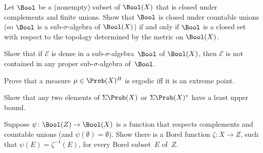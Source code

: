\begin{exercises}

\item \label{sigma<>closed}
Let $\Bool$ be a (nonempty) subset of $\Bool(X)$ that is closed under complements and finite unions. Show that $\Bool$ is closed under countable unions (so $\Bool$ is a sub-$\sigma$-algebra of $\Bool(X)$) if and only if $\Bool$ is a closed set with respect to the topology determined by the metric on $\Bool(X)$.

\item \label{DenseGensSigmaAlg}
Show that if $\mathcal{E}$ is dense in a sub-$\sigma$-algebra~$\Bool$ of $\Bool(X)$, then $\mathcal{E}$ is not contained in any proper sub-$\sigma$-algebra of~$\Bool$.

\item \label{Erg<>Extreme}
Prove that a measure $\mu \in \Prob(X)^H$ is ergodic iff it is an extreme point.

\item \label{ProbLUB}
Show that any two elements of $\Sigma \Prob(X)$ or $\Sigma \Prob(X)^*$ have a least upper bound.

\item \label{BoolPtwise}
Suppose $\psi \colon \Bool(Z) \to \Bool(X)$ is a function that respects complements and countable unions (and $\psi(\emptyset) = \emptyset$). Show there is a Borel function $\zeta \colon X \to Z$, such that $\psi(E) = \zeta^{-1}(E)$, for every Borel subset~$E$ of~$Z$.

\end{exercises}




